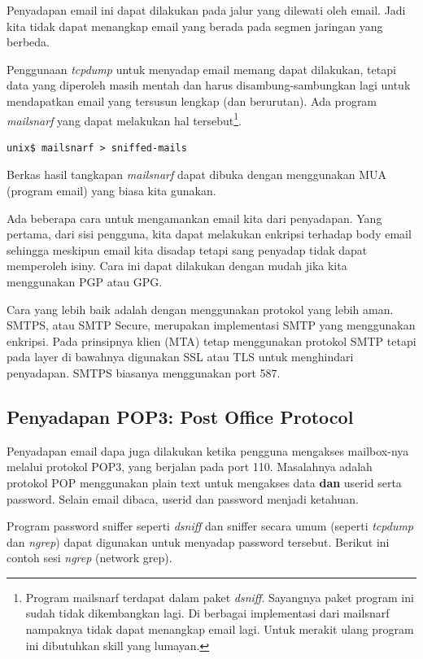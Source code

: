 Penyadapan email ini dapat dilakukan pada jalur yang dilewati oleh email. Jadi
kita tidak dapat menangkap email yang berada pada segmen jaringan yang berbeda.

Penggunaan {\em tcpdump} untuk menyadap email memang dapat dilakukan, tetapi
data yang diperoleh masih mentah dan harus disambung-sambungkan lagi untuk
mendapatkan email yang tersusun lengkap (dan berurutan). Ada program {\em
mailsnarf} yang dapat melakukan hal tersebut\footnote{Program mailsnarf
terdapat dalam paket {\em dsniff}. Sayangnya paket program ini sudah tidak
dikembangkan lagi. Di berbagai implementasi dari mailsnarf nampaknya tidak
dapat menangkap email lagi. Untuk merakit ulang program ini dibutuhkan skill
yang lumayan.}.

\begin{verbatim}
unix$ mailsnarf > sniffed-mails
\end{verbatim}

Berkas hasil tangkapan {\em mailsnarf} dapat dibuka dengan menggunakan MUA
(program email) yang biasa kita gunakan.

Ada beberapa cara untuk mengamankan email kita dari penyadapan. Yang pertama,
dari sisi pengguna, kita dapat melakukan enkripsi terhadap body email sehingga
meskipun email kita disadap tetapi sang penyadap tidak dapat memperoleh isiny.
Cara ini dapat dilakukan dengan mudah jika kita menggunakan PGP atau GPG.

Cara yang lebih baik adalah dengan menggunakan protokol yang lebih aman. SMTPS,
atau SMTP Secure, merupakan implementasi SMTP yang menggunakan enkripsi. Pada
prinsipnya klien (MTA) tetap menggunakan protokol SMTP tetapi pada layer di
bawahnya digunakan SSL atau TLS untuk menghindari penyadapan. SMTPS biasanya
menggunakan port 587.

\subsection{Penyadapan POP3: Post Office Protocol}

Penyadapan email dapa juga dilakukan ketika pengguna mengakses mailbox-nya
melalui protokol POP3, yang berjalan pada port 110. Masalahnya adalah protokol
POP menggunakan plain text untuk mengakses data {\bf dan} userid serta
password. Selain email dibaca, userid dan password menjadi ketahuan.

Program password sniffer seperti {\em dsniff} dan sniffer secara umum (seperti
{\em tcpdump} dan {\em ngrep}) dapat digunakan untuk menyadap password
tersebut. Berikut ini contoh sesi {\em ngrep} (network grep).

